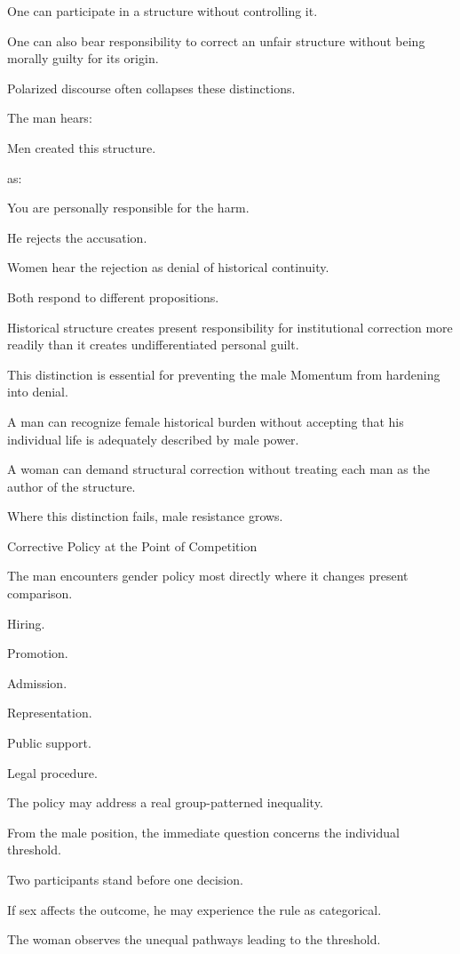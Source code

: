 One can participate in a structure without controlling it.

One can also bear responsibility to correct an unfair structure without being morally guilty for its origin.

Polarized discourse often collapses these distinctions.

The man hears:

Men created this structure.

as:

You are personally responsible for the harm.

He rejects the accusation.

Women hear the rejection as denial of historical continuity.

Both respond to different propositions.

Historical structure creates present responsibility for institutional correction more readily than it creates undifferentiated personal guilt.

This distinction is essential for preventing the male Momentum from hardening into denial.

A man can recognize female historical burden without accepting that his individual life is adequately described by male power.

A woman can demand structural correction without treating each man as the author of the structure.

Where this distinction fails, male resistance grows.

Corrective Policy at the Point of Competition

The man encounters gender policy most directly where it changes present comparison.

Hiring.

Promotion.

Admission.

Representation.

Public support.

Legal procedure.

The policy may address a real group-patterned inequality.

From the male position, the immediate question concerns the individual threshold.

Two participants stand before one decision.

If sex affects the outcome, he may experience the rule as categorical.

The woman observes the unequal pathways leading to the threshold.

